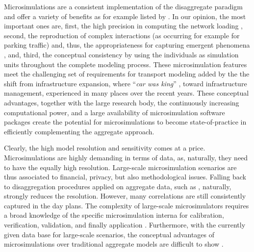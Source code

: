 Microsimulations are a consistent implementation of the disaggregate paradigm and offer a variety of benefits as for example listed by \citet[][]{Miller_ABTFC_1996, VovshaEtAl_TRR_2002, NagelBarrett_IJMPC_1997, Bonabeau_PNAS_2002, CharyparEtAl_TRR_2007}. In our opinion, the most important ones are, first, the high precision in computing the network loading \citep[][p.508/524]{NagelBarrett_IJMPC_1997}, second, the reproduction of complex interactions (as occurring for example for parking traffic) and, thus, the appropriateness for capturing emergent phenomena \citep[][]{Bonabeau_PNAS_2002}, and, third, the conceptual consistency by using the individuals as simulation units throughout the complete modeling process. These microsimulation features meet the challenging set of requirements for transport modeling added by the the shift from infrastructure expansion, where ``\emph{car was king}'' \citep[][]{Daly_unpub_STRC_2013}, toward infrastructure management, experienced in many places over the recent years. These conceptual advantages, together with the large research body, the continuously increasing computational power, and a large availability of microsimulation software packages create the potential for microsimulations to become state-of-practice in efficiently complementing the aggregate approach.

Clearly, the high model resolution and sensitivity comes at a price. Microsimulations are highly demanding in terms of data, as, naturally, they need to have the equally high resolution. Large-scale microsimulation scenarios are thus associated to financial, privacy, but also methodological issues. Falling back to disaggregation procedures applied on aggregate data, such as \citet[][]{BalmerRieser_TechRep_IVT_2004}, naturally, strongly reduces the resolution. However, many correlations are still consistently captured in the day plans. The complexity of large-scale microsimulators requires a broad knowledge of the specific microsimulation interna for calibration, verification, validation, and finally application \citep[e.g.,][p.273]{SmithEtAl_JTE_2008}. Furthermore, with the currently given data base for large-scale scenarios, the conceptual advantages of microsimulations over traditional aggregate models are difficult to show \citep[][]{LempEtAl_TRR_2007}.

